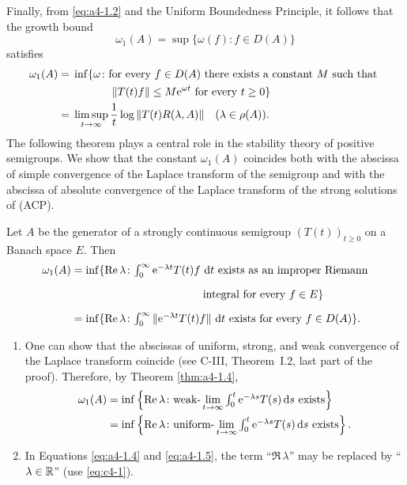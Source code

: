 Finally, from \eqref{eq:a4-1.2} and the Uniform Boundedness Principle, it follows that the growth bound 
%
\[
	\omega_{1}(A) = \sup\{\omega(f) \colon f \in D(A)\}
\]
%
satisfies
\begin{align}
\omega_1(A) &={} \inf \{ \omega \colon \text{for every  $f \in D(A)$  there exists a constant $ M $ such that  }\notag \\
& \phantom{xxxxxxxx} \text{ $\|T(t)f\| \leq M\mathrm{e}^{\omega t}$  for every $t \geq 0$} \} \\
&={}
\limsup_{t \to \infty} \frac{1}{t} \log\|T(t)R(\lambda,A)\| \quad (\lambda \in \rho(A)). 
\notag
\end{align}
The following theorem plays a central role in the stability theory of positive semigroups.
We show that the constant $\omega_{1}(A)$ coincides both with the abscissa of simple convergence of the Laplace transform of the semigroup and with the abscissa of absolute convergence of the Laplace transform of the strong solutions of (ACP).
\begin{theorem}\label{thm:a4-1.4}
Let $A$ be the generator of a strongly continuous semigroup $ (T(t))_{t \geq 0} $ on a Banach space $E$. 
Then
\begin{align}\label{eq:a4-1.4}
\omega_{1}(A) &= \inf\{\Re\,\lambda \colon \textstyle{\int_{0}^{\infty} \mathrm{e}^{-\lambda t} T(t)f \,\dt} \text{ exists as an improper Riemann} \\
&\phantom{= \inf\{\Re\,\lambda \colon \int_{0}^{\infty} \mathrm{e}^{-\lambda t} T(t)f} \text{integral for every } f \in E\} \notag \\
&= \inf\{\Re\,\lambda \colon \textstyle{\int_{0}^{\infty} \|\mathrm{e}^{-\lambda t} T(t)f\| \,\dt} \text{ exists for every } f \in D(A)\}.\notag
\end{align}
\end{theorem}
\begin{remarks*}\label{rem:a4-1.4}

\begin{enumerate}[\upshape (i), wide, labelsep=1em]

\item 
One can show that the abscissas of uniform, strong, and weak convergence of the Laplace transform coincide (see C-III, Theorem~I.2, last part of the proof). 
Therefore, by Theorem \ref{thm:a4-1.4},
\begin{align}\label{eq:a4-1.5}
\omega_1(A) &= \inf \left\{ \mathop{}\!\mathrm{Re}\,\lambda\colon\text{weak-} \lim_{t \to \infty} \textstyle{\int_0^t \mathrm{e}^{-\lambda s} T(s)  \mathop{}\!\mathrm{d}{s}} \text{ exists} \right\}
\\
    &= \inf \left\{ \mathop{}\!\mathrm{Re}\,\lambda\colon\text{uniform-} \lim_{t \to \infty} \textstyle{\int_0^t \mathrm{e}^{-\lambda s} T(s)  \mathop{}\!\mathrm{d}{s}} \text{ exists} \right\}.\notag
\end{align}

\item
In Equations \eqref{eq:a4-1.4} and \eqref{eq:a4-1.5}, the term \enquote{$\Re\,\lambda$} may be replaced by \enquote{$\lambda \in \mathbb{R}$} (use \eqref{eq:c4-1}).
\end{enumerate}

\end{remarks*}

